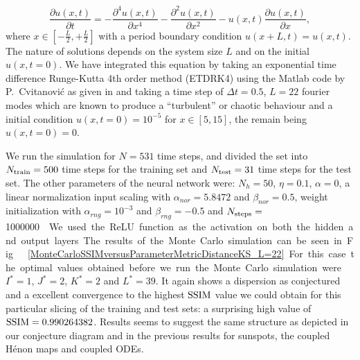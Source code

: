 \documentclass[journal]{IEEEtran}
\begin{document}
\begin{equation}
\label{kuramotoSivashinskyequation}
\frac{\partial u(x,t)}{\partial t} = -\frac{\partial^4 u(x,t)}{\partial x^4}-\frac{\partial^2 u(x,t)}{\partial x^2}-u(x,t)
\frac{\partial u(x,t)}{\partial x},
\end{equation}
where $x \in [-\frac{L}{2},+\frac{L}{2}]$ with a period boundary condition 
$u(x+L,t)=u(x,t)$. The nature of solutions depends on the system size $L$ and on the initial $u(x,t=0)$. 
We have integrated this equation by taking an exponential time difference Runge-Kutta 4th order method (ETDRK4)
using the Matlab code by P.\ Cvitanovi\'c as given in \cite{BibEntry2007Apr} and 
taking a time step of $\Delta t=0.5$, $L=22$ fourier modes which are known to produce a ``turbulent'' or chaotic behaviour
and a initial condition $u(x,t=0)=10^{-5}$ for $x\in[5,15]$, the remain being $u(x,t=0)=0$.



We run the simulation for $N=531$ time steps, and divided the set into $N_{\textnormal{train}}=500$ time steps for the training set
and $N_{\textnormal{test}}=31$ time steps for the test set. The other parameters of the neural network were:
$N_h=50$, $\eta=0.1$, $\alpha=0$, a linear normalization input scaling with 
$\alpha_{nor} = 5.8472$ and $\beta_{nor} =0.5$, weight initialization 
with $\alpha_{rng} = 10^{-3}$ and $\beta_{rng} = -0.5$ and $N_{\textnormal{steps}}=$\SI{1000000}\nobreak. 
We used the ReLU function as the activation on both the hidden and output layers.

The results of the Monte Carlo simulation can be seen in Fig.\ \ref{MonteCarloSSIMversusParameterMetricDistanceKS_L=22}. For this 
case the optimal values obtained before we run the Monte Carlo simulation were $I^*=1$, $J^*=2$, $K^*=2$ and $L^*=39$. It again shows a dispersion as 
conjectured and a excellent convergence to the highest $\textnormal{SSIM}$ value we could obtain for this particular slicing of the training and 
test sets: a surprising high value of $\textnormal{SSIM}=0.990264382$. Results seems to suggest the same structure as depicted in our 
conjecture diagram and in the previous results for sunspots, the coupled H\'{e}non maps and coupled ODEs. 


\end{document}
